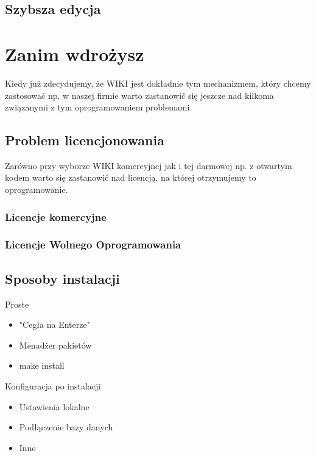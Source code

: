 \documentclass{article}
\begin{document}
	\subsection{Szybsza edycja}


\newpage
\section{Zanim wdrożysz}
Kiedy już zdecydujemy, że WIKI jest dokładnie tym mechanizmem, który chcemy zastosować np. w naszej firmie warto zastanowić się jeszcze nad kilkoma związanymi z tym oprogramowaniem problemami.
	\subsection{Problem licencjonowania}
	Zarówno przy wyborze WIKI komercyjnej jak i tej darmowej np. z otwartym kodem warto się zastanowić nad licencją, na której otrzymujemy to oprogramowanie.
	\subsubsection{Licencje komercyjne}
	\subsubsection{Licencje Wolnego Oprogramowania}
	\subsection{Sposoby instalacji}
		Proste
		\begin{itemize}
			\item "Cegła na Enterze"
			\item Menadżer pakietów
			\item make install
		\end{itemize}
		Konfiguracja po instalacji
		\begin{itemize}
			\item Ustawienia lokalne
			\item Podłączenie bazy danych
			\item Inne
		\end{itemize}
\end{document}
